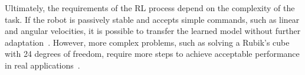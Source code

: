 Ultimately, the requirements of the RL process depend on the complexity of the task. If the robot is passively stable and accepts simple commands, such as linear and angular velocities, it is possible to transfer the learned model without further adaptation~\cite{hu2021sim}. However, more complex problems, such as solving a Rubik's cube with 24 degrees of freedom, require more steps to achieve acceptable performance in real applications~\cite{akkaya2019solving}. %